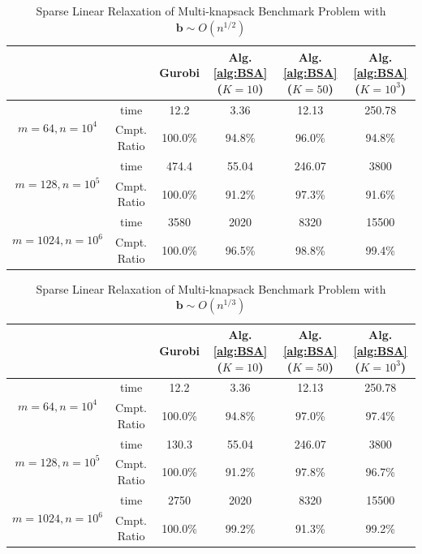 \documentclass{article} %
\begin{document}
\begin{table}[ht!]
    \centering
    \small
    \begin{tabular}{cc|c|c|c|c}
    \toprule
         && Gurobi  & Alg. \ref{alg:BSA} ($K=10$) & Alg. \ref{alg:BSA} ($K=50$) & Alg. \ref{alg:BSA}  ($K=10^3$) \\
         \midrule
   \multirow{2}{*}{\scriptsize $m=64, n=10^4$}  & time & 12.2 & 3.36 & 12.13 & 250.78 \\
   & Cmpt. Ratio &100.0\% &  94.8\% & 96.0\% & 94.8\%  \\
\midrule
  \multirow{2}{*}{\scriptsize $m=128, n=10^5$} &  time  & 474.4 & 55.04 &  246.07  & 3800  \\ 
   &Cmpt. Ratio & 100.0\% & 91.2\% & 97.3\% & 91.6\%   \\
\midrule
    \multirow{2}{*}{\scriptsize $m=1024, n=10^6$} &  time   &  3580  & 2020 & 8320 & 15500  \\ 
  & Cmpt. Ratio & 100.0\% & 96.5\% & 98.8\% & 99.4\% \\
   \bottomrule
    \end{tabular}
        \caption{Sparse Linear Relaxation of Multi-knapsack Benchmark Problem with $\bm{b}\sim O(n^{1/2})$}
    \label{tab:solsp_1/2}
\end{table}

\begin{table}[ht!]
    \centering
    \small
    \begin{tabular}{cc|c|c|c|c}
    \toprule
         && Gurobi  & Alg. \ref{alg:BSA} ($K=10$) & Alg. \ref{alg:BSA} ($K=50$) & Alg. \ref{alg:BSA}  ($K=10^3$) \\
         \midrule
   \multirow{2}{*}{\scriptsize $m=64, n=10^4$}  & time & 12.2 & 3.36 & 12.13 & 250.78 \\
   & Cmpt. Ratio &100.0\% & 94.8\% & 97.0\% & 97.4\%  \\
\midrule
  \multirow{2}{*}{\scriptsize $m=128, n=10^5$} &  time  & 130.3 & 55.04 &  246.07  & 3800  \\ 
   &Cmpt. Ratio & 100.0\% & 91.2\% & 97.8\% &  96.7\%   \\
\midrule
    \multirow{2}{*}{\scriptsize $m=1024, n=10^6$} &  time   &  2750  & 2020 & 8320 & 15500  \\ 
  & Cmpt. Ratio & 100.0\% & 99.2\% & 91.3\% & 99.2\% \\
   \bottomrule
    \end{tabular}
        \caption{Sparse Linear Relaxation of Multi-knapsack Benchmark Problem with $\bm{b}\sim O(n^{1/3})$}
    \label{tab:solsp_1/3}
\end{table}
\end{document}
